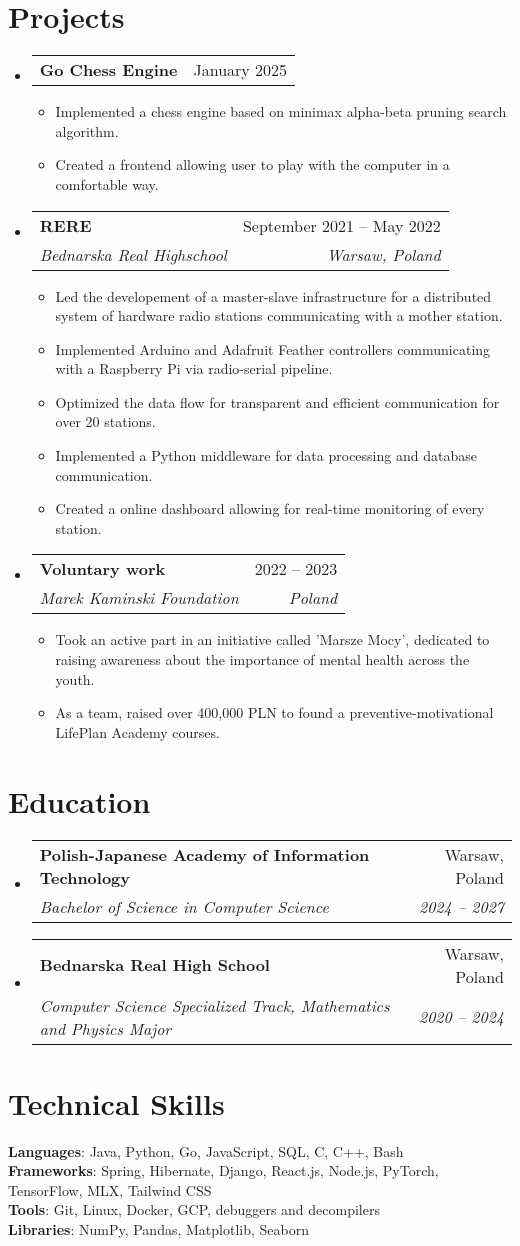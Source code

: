\documentclass[letterpaper,11pt]{article}
\makeatletter
\newcommand{\resumeItem}[1]{
  \item\small{
    {#1 \vspace{-2pt}}
  }
}
\newcommand{\resumeSubheading}[4]{
  \vspace{-2pt}\item
    \begin{tabular*}{0.97\textwidth}[t]{l@{\extracolsep{\fill}}r}
      \textbf{#1} & #2 \\
      \textit{\small#3} & \textit{\small #4} \\
    \end{tabular*}\vspace{-7pt}
}
\newcommand{\resumeSubheadingNoDate}[2]{
  \vspace{-2pt}\item
    \begin{tabular*}{0.97\textwidth}[t]{l@{\extracolsep{\fill}}r}
      \textbf{#1} & #2 \\
    \end{tabular*}\vspace{-7pt}
}
\newcommand{\resumeSubHeadingListStart}{\begin{itemize}[leftmargin=0.15in, label={}]}
\newcommand{\resumeSubHeadingListEnd}{\end{itemize}}
\newcommand{\resumeItemListStart}{\begin{itemize}}
\newcommand{\resumeItemListEnd}{\end{itemize}\vspace{-5pt}}
\makeatother
\begin{document}
\section{Projects}
  \resumeSubHeadingListStart
    \resumeSubheadingNoDate
      {Go Chess Engine}{January 2025}
      \resumeItemListStart
        \resumeItem{Implemented a chess engine based on minimax alpha-beta pruning search algorithm.}
        \resumeItem{Created a frontend allowing user to play with the computer in a comfortable way.}
      \resumeItemListEnd
    \resumeSubheading
      {RERE}{September 2021 -- May 2022}
      {Bednarska Real Highschool}{Warsaw, Poland}
      \resumeItemListStart
        \resumeItem{Led the developement of a master-slave infrastructure for a distributed system of hardware radio stations communicating with a mother station.}
        \resumeItem{Implemented Arduino and Adafruit Feather controllers communicating with a Raspberry Pi via radio-serial pipeline.}
        \resumeItem{Optimized the data flow for transparent and efficient communication for over 20 stations.}
        \resumeItem{Implemented a Python middleware for data processing and database communication.}
        \resumeItem{Created a online dashboard allowing for real-time monitoring of every station.}
      \resumeItemListEnd
    \resumeSubheading
      {Voluntary work}{2022 -- 2023}
      {Marek Kaminski Foundation}{Poland}
      \resumeItemListStart
        \resumeItem{Took an active part in an initiative called 'Marsze Mocy', dedicated to raising awareness about the importance of mental health across the youth.}
        \resumeItem{As a team, raised over 400,000 PLN to found a preventive-motivational LifePlan Academy courses.}
      \resumeItemListEnd
  \resumeSubHeadingListEnd

\section{Education}
    \resumeSubHeadingListStart
      \resumeSubheading
        {Polish-Japanese Academy of Information Technology}{Warsaw, Poland}
        {Bachelor of Science in Computer Science}{2024 -- 2027}
      \resumeSubheading
        {Bednarska Real High School}{Warsaw, Poland}
        {Computer Science Specialized Track, Mathematics and Physics Major}{2020 -- 2024}
  \resumeSubHeadingListEnd


\section{Technical Skills}
  \begin{itemize}[leftmargin=0.15in, label={}]
    \small{\item{
      \textbf{Languages}{: Java, Python, Go, JavaScript, SQL, C, C++, Bash} \\
      \textbf{Frameworks}{: Spring, Hibernate, Django, React.js, Node.js, PyTorch, TensorFlow, MLX, Tailwind CSS} \\
      \textbf{Tools}{: Git, Linux, Docker, GCP, debuggers and decompilers} \\
      \textbf{Libraries}{: NumPy, Pandas, Matplotlib, Seaborn} \\
    }}
  \end{itemize}

  
\end{document}

